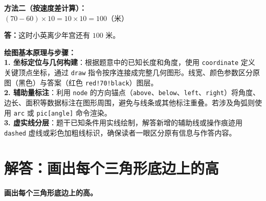 \documentclass[12pt, a4paper]{ctexrep}
\begin{document}
\noindent
\textbf{方法二（按速度差计算）：}\\
$(70 - 60) \times 10 = 10 \times 10 = 100$（米）

\vspace{0.4cm}

\noindent
\textbf{答：}这时小英离少年宫还有 $100$ 米。

\vspace{0.8cm}


\vspace{0.6cm}

{\small\color{blue!70!black}
\textbf{绘图基本原理与步骤：}\\
\textbf{1. 坐标定位与几何构建}：根据题意中的已知长度和角度，使用 \texttt{coordinate} 定义关键顶点坐标，通过 \texttt{draw} 指令按序连接成完整几何图形。线宽、颜色参数区分原图（黑色）与答案（红色 \texttt{red!70!black}）图层。\\
\textbf{2. 辅助量标注}：利用 \texttt{node} 的方向锚点（\texttt{above}、\texttt{below}、\texttt{left}、\texttt{right}）将角度、边长、面积等数据标注在图形周围，避免与线条或其他标注重叠。若涉及角弧则使用 \texttt{arc} 或 \texttt{pic[angle]} 命令渲染。\\
\textbf{3. 虚实线分层}：题干已知条件用实线绘制，解答新增的辅助线或操作痕迹用 \texttt{dashed} 虚线或彩色加粗线标识，确保读者一眼区分原有信息与作答内容。
}

\newpage

\section{解答：画出每个三角形底边上的高}

\vspace{0.4cm}

\noindent\textbf{画出每个三角形底边上的高。}

\vspace{0.8cm}
\end{document}
